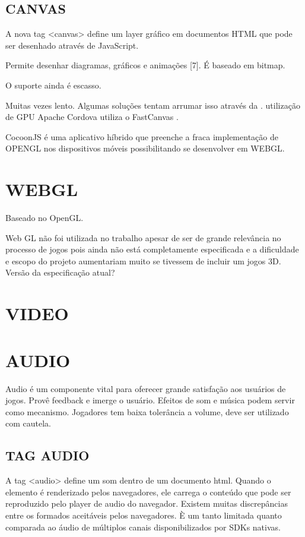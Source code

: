 \documentclass[11pt,a4paper]{article}
\begin{document}
\subsection{CANVAS}

A nova tag <canvas> define um layer gráfico em documentos HTML que pode
ser desenhado através de JavaScript.

Permite desenhar diagramas, gráficos e animações [7]. É baseado em
bitmap.

O suporte ainda é escasso.

Muitas vezes lento. Algumas soluções tentam arrumar isso através da .
utilização de GPU Apache Cordova utiliza o FastCanvas                .

CocoonJS é uma aplicativo híbrido que preenche a fraca implementação
de OPENGL nos dispositivos móveis possibilitando se desenvolver em
WEBGL.

\section{WEBGL}

Baseado no OpenGL.

Web GL não foi utilizada no trabalho apesar de ser de grande
relevância no processo de jogos pois ainda não está completamente
especificada e a dificuldade e escopo do projeto aumentariam muito se
tivessem de incluir um jogos 3D. Versão da especificação atual?

\section{VIDEO}

\section{AUDIO}

Audio é um componente vital para oferecer grande satisfação aos
usuários de jogos. Provê feedback e imerge o usuário. Efeitos de som
e música podem servir como mecanismo. Jogadores tem baixa tolerância a
volume, deve ser utilizado com cautela.

\subsection{TAG AUDIO}

A tag <audio> define um som dentro de um documento html. Quando o
elemento é renderizado pelos navegadores, ele carrega o conteúdo
que pode ser reproduzido pelo player de audio do navegador. Existem
muitas discrepâncias entre os formados aceitáveis pelos navegadores.
È um tanto limitada quanto comparada ao áudio de múltiplos canais
disponibilizados por SDKs nativas.
\end{document}
